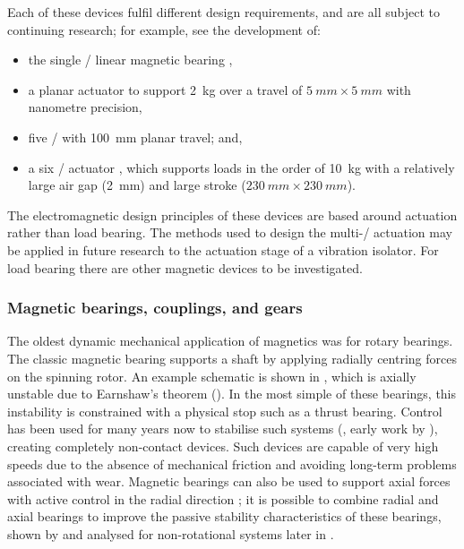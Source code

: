 \documentclass[11pt,a4paper]{memoir}
\begin{document}
Each of these devices fulfil different design requirements, and are all subject to continuing research; for example, see the development of:
\begin{itemize}
\item the single \dof/ linear magnetic bearing \cite{ro2009-preeng},
\item a planar actuator \cite{kim2007} to support \SI{2}{kg} over a travel of $\SI{5}{mm}\times\SI{5}{mm}$ with nanometre precision,
\item five \dof/ \cite{fulford2009} with \SI{100}{mm} planar travel; and,
\item a six \dof/ actuator \cite{jansen2008}, which supports loads in the order of \SI{10}{kg} with a relatively large air gap (\SI{2}{mm}) and large stroke ($\SI{230}{mm}\times\SI{230}{mm}$).
\end{itemize}
The electromagnetic design principles of these devices are based around actuation rather than load bearing.
The methods used to design the multi-\dof/ actuation may be applied in future research to the actuation stage of a vibration isolator.
For load bearing there are other magnetic devices to be investigated.


\subsubsection{Magnetic bearings, couplings, and gears}

The oldest dynamic mechanical application of magnetics was for rotary
bearings.
The classic magnetic bearing supports a shaft by applying radially centring forces on the spinning rotor.
An example schematic is shown in , which is axially unstable due to Earnshaw's theorem ().
In the most simple of these bearings, this instability is constrained with a physical stop such as a thrust bearing.
Control has been used for many years now to stabilise such systems (\eg, early work by \textcite{shimizu1968}), creating completely non-contact devices.
Such devices are capable of very high speeds due to the absence of mechanical friction and avoiding long-term problems associated with wear.
Magnetic bearings can also be used to support axial forces with active control in the radial direction \cite{asami2005}; it is possible to combine radial and axial bearings to improve the passive stability characteristics of these bearings, shown by \textcite{delamare1994-ietm} and analysed for non-rotational systems later in .
\end{document}
